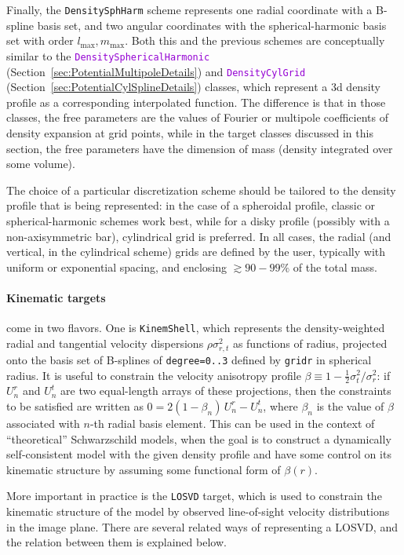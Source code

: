 \documentclass[12pt]{article}
\newcommand{\ttt}[1]{\textcolor{darkviolet}{\texttt{#1}}}
\newcommand{\ppp}[1]{\textcolor{darkolive} {\texttt{#1}}}
\begin{document}
Finally, the \ppp{DensitySphHarm} scheme represents one radial coordinate with a B-spline basis set, and two angular coordinates with the spherical-harmonic basis set with order $l_\mathrm{max},m_\mathrm{max}$. Both this and the previous schemes are conceptually similar to the \ttt{Density\-SphericalHarmonic} (Section~\ref{sec:PotentialMultipoleDetails}) and \ttt{DensityCylGrid} (Section~\ref{sec:PotentialCylSplineDetails}) classes, which represent a 3d density profile as a corresponding interpolated function. The difference is that in those classes, the free parameters are the values of Fourier or multipole coefficients of density expansion at grid points, while in the target classes discussed in this section, the free parameters have the dimension of mass (density integrated over some volume).

The choice of a particular discretization scheme should be tailored to the density profile that is being represented: in the case of a spheroidal profile, classic or spherical-harmonic schemes work best, while for a disky profile (possibly with a non-axisymmetric bar), cylindrical grid is preferred. In all cases, the radial (and vertical, in the cylindrical scheme) grids are defined by the user, typically with uniform or exponential spacing, and enclosing $\gtrsim 90-99\%$ of the total mass.

\paragraph{Kinematic targets} come in two flavors. One is \ppp{KinemShell}, which represents the density-weighted radial and tangential velocity dispersions $\rho\sigma_{r,t}^2$ as functions of radius, projected onto the basis set of B-splines of \ppp{degree=0..3} defined by \ppp{gridr} in spherical radius. 
It is useful to constrain the velocity anisotropy profile $\beta\equiv 1 - \frac12 \sigma_t^2/\sigma_r^2$: if $U_n^r$ and $U_n^t$ are two equal-length arrays of these projections, then the constraints to be satisfied are written as $0 = 2(1-\beta_n)\,U_n^r - U_n^t$, where $\beta_n$ is the value of $\beta$ associated with $n$-th radial basis element. This can be used in the context of ``theoretical'' Schwarzschild models, when the goal is to construct a dynamically self-consistent model with the given density profile and have some control on its kinematic structure by assuming some functional form of $\beta(r)$.

More important in practice is the \ppp{LOSVD} target, which is used to constrain the kinematic structure of the model by observed line-of-sight velocity distributions in the image plane. There are several related ways of representing a LOSVD, and the relation between them is explained below.
\end{document}
